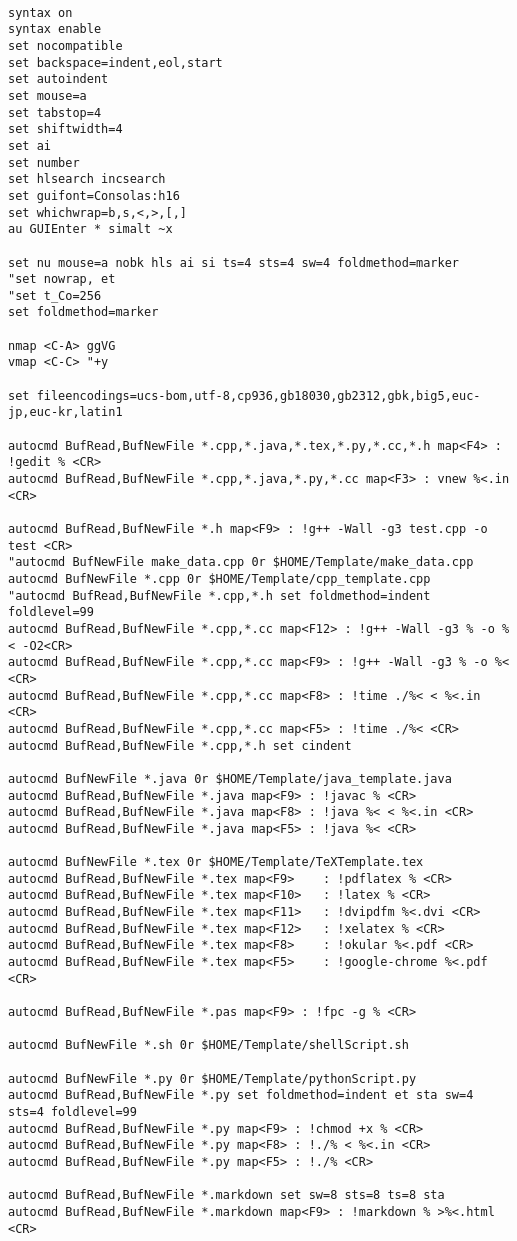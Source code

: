 ﻿\begin{lstlisting}

syntax on
syntax enable
set nocompatible
set backspace=indent,eol,start
set autoindent
set mouse=a
set tabstop=4
set shiftwidth=4
set ai
set number
set hlsearch incsearch
set guifont=Consolas:h16
set whichwrap=b,s,<,>,[,]
au GUIEnter * simalt ~x

set nu mouse=a nobk hls ai si ts=4 sts=4 sw=4 foldmethod=marker
"set nowrap, et
"set t_Co=256
set foldmethod=marker

nmap <C-A> ggVG
vmap <C-C> "+y

set fileencodings=ucs-bom,utf-8,cp936,gb18030,gb2312,gbk,big5,euc-jp,euc-kr,latin1

autocmd BufRead,BufNewFile *.cpp,*.java,*.tex,*.py,*.cc,*.h map<F4> : !gedit % <CR>
autocmd BufRead,BufNewFile *.cpp,*.java,*.py,*.cc map<F3> : vnew %<.in <CR>

autocmd BufRead,BufNewFile *.h map<F9> : !g++ -Wall -g3 test.cpp -o test <CR>
"autocmd BufNewFile make_data.cpp 0r $HOME/Template/make_data.cpp
autocmd BufNewFile *.cpp 0r $HOME/Template/cpp_template.cpp
"autocmd BufRead,BufNewFile *.cpp,*.h set foldmethod=indent foldlevel=99
autocmd BufRead,BufNewFile *.cpp,*.cc map<F12> : !g++ -Wall -g3 % -o %< -O2<CR>
autocmd BufRead,BufNewFile *.cpp,*.cc map<F9> : !g++ -Wall -g3 % -o %< <CR>
autocmd BufRead,BufNewFile *.cpp,*.cc map<F8> : !time ./%< < %<.in <CR>
autocmd BufRead,BufNewFile *.cpp,*.cc map<F5> : !time ./%< <CR>
autocmd BufRead,BufNewFile *.cpp,*.h set cindent

autocmd BufNewFile *.java 0r $HOME/Template/java_template.java
autocmd BufRead,BufNewFile *.java map<F9> : !javac % <CR>
autocmd BufRead,BufNewFile *.java map<F8> : !java %< < %<.in <CR>
autocmd BufRead,BufNewFile *.java map<F5> : !java %< <CR>

autocmd BufNewFile *.tex 0r $HOME/Template/TeXTemplate.tex
autocmd BufRead,BufNewFile *.tex map<F9>	: !pdflatex % <CR>
autocmd BufRead,BufNewFile *.tex map<F10>	: !latex % <CR>
autocmd BufRead,BufNewFile *.tex map<F11>	: !dvipdfm %<.dvi <CR>
autocmd BufRead,BufNewFile *.tex map<F12>	: !xelatex % <CR>
autocmd BufRead,BufNewFile *.tex map<F8>	: !okular %<.pdf <CR>
autocmd BufRead,BufNewFile *.tex map<F5>	: !google-chrome %<.pdf <CR>

autocmd BufRead,BufNewFile *.pas map<F9> : !fpc -g % <CR>

autocmd BufNewFile *.sh 0r $HOME/Template/shellScript.sh

autocmd BufNewFile *.py 0r $HOME/Template/pythonScript.py
autocmd BufRead,BufNewFile *.py set foldmethod=indent et sta sw=4 sts=4 foldlevel=99
autocmd BufRead,BufNewFile *.py map<F9> : !chmod +x % <CR>
autocmd BufRead,BufNewFile *.py map<F8> : !./% < %<.in <CR>
autocmd BufRead,BufNewFile *.py map<F5> : !./% <CR>

autocmd BufRead,BufNewFile *.markdown set sw=8 sts=8 ts=8 sta
autocmd BufRead,BufNewFile *.markdown map<F9> : !markdown % >%<.html <CR>


\end{lstlisting}
